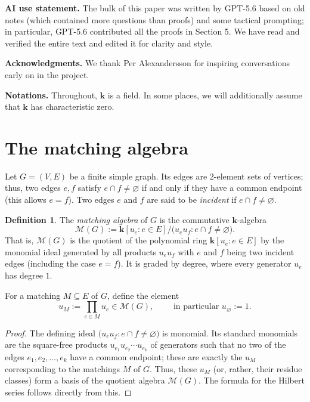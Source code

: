\documentclass[12pt]{amsart}
\newtheorem{proposition}[theorem]{Proposition}
\theoremstyle{definition}
\newtheorem{definition}[theorem]{Definition}
\theoremstyle{remark}
\newcommand{\kk}{\mathbf{k}}
\newcommand{\Hilb}{\operatorname{Hilb}}
\begin{document}
\medskip
\textbf{AI use statement.}
The bulk of this paper was written by GPT-5.6 based on old notes
(which contained more questions than proofs) and some tactical prompting;
in particular, GPT-5.6 contributed all the proofs in Section 5.
We have read and verified the entire text and edited it for
clarity and style.

\medskip
\textbf{Acknowledgments.}
We thank Per Alexandersson for inspiring conversations early on in the
project.

\medskip
\textbf{Notations.}
Throughout, $\kk$ is a field.
In some places, we will additionally assume that $\kk$ has characteristic zero.

\section{The matching algebra}

Let $G = (V, E)$ be a finite simple graph.
Its edges are $2$-element sets of vertices;
thus, two edges $e,f$ satisfy $e\cap f \ne\varnothing$
if and only if they have a common endpoint (this allows $e=f$).
Two edges $e$ and $f$ are said to be \emph{incident} if
$e\cap f \ne\varnothing$.

\begin{definition}
The \emph{matching algebra} of $G$ is the commutative $\kk$-algebra
\[
 \mathcal M(G):=
 \kk[u_e:e\in E]/\bigl(u_eu_f:e\cap f\ne\varnothing\bigr).
\]
That is, $\mathcal M(G)$ is the quotient of the polynomial ring
$\kk[u_e:e\in E]$ by the monomial ideal generated by all products
$u_eu_f$ with $e$ and $f$ being two incident edges
(including the case $e=f$).
It is graded by degree, where every generator $u_e$ has degree $1$.
\end{definition}

For a matching $M\subseteq E$ of $G$, define the element
\[
 u_M:=\prod_{e\in M}u_e \in \mathcal M(G),
 \qquad \text{ in particular }
 u_\varnothing:=1.
\]


\begin{proof}
The defining ideal $\bigl(u_eu_f:e\cap f\ne\varnothing\bigr)$ is monomial.
Its standard monomials are the square-free
products $u_{e_1} u_{e_2} \cdots u_{e_k}$ of generators
such that no two of the edges $e_1, e_2, \ldots, e_k$ have
a common endpoint; these are exactly the $u_M$
corresponding to the matchings $M$ of $G$.
Thus, these $u_M$ (or, rather, their residue classes) form
a basis of the quotient algebra $\mathcal M(G)$.
The formula for the Hilbert series follows directly from this.
\end{proof}
\end{document}
